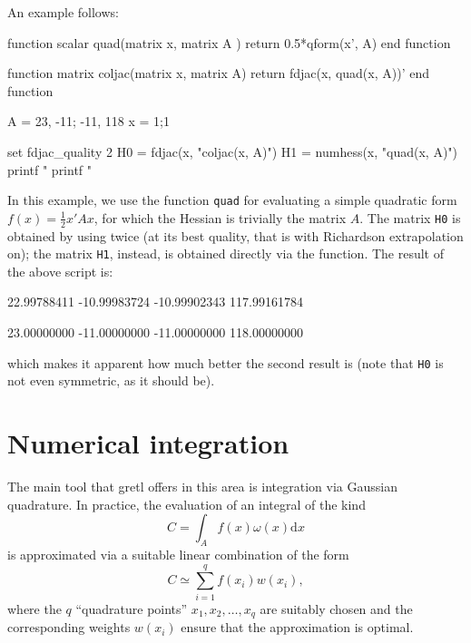 An example follows:
\begin{code}
function scalar quad(matrix x, matrix A )
    return 0.5*qform(x', A)
end function

function matrix coljac(matrix x, matrix A)
    return fdjac(x, quad(x, A))'
end function

A = {23, -11; -11, 118}
x = {1;1}

set fdjac_quality 2
H0 = fdjac(x, "coljac(x, A)")
H1 = numhess(x, "quad(x, A)")
printf "\n%
printf "\n%
\end{code}
In this example, we use the function \texttt{quad} for evaluating a
simple quadratic form $f(x) = \frac{1}{2} x'Ax$, for which the Hessian
is trivially the matrix $A$. The matrix \texttt{H0} is obtained by
using  twice (at its best quality, that is with Richardson
extrapolation on); the matrix \texttt{H1}, instead, is obtained
directly via the  function. The result of the above
script is:
\begin{code}
   22.99788411  -10.99983724
  -10.99902343  117.99161784

   23.00000000  -11.00000000
  -11.00000000  118.00000000
\end{code}
which makes it apparent how much better the second result is (note
that \texttt{H0} is not even symmetric, as it should be). 

\section{Numerical integration}
\label{sec:numint}

The main tool that gretl offers in this area is integration via
Gaussian quadrature. In practice, the evaluation of an integral of the
kind
\begin{equation}
  \label{eq:quadint}
  C = \int_{A} f(x) \omega(x) \mathrm{d}x
\end{equation}
is approximated via a suitable linear combination of the form
\begin{equation}
  \label{eq:quadsum}
  C \simeq \sum_{i=1}^q f(x_i) w(x_i) ,
\end{equation}
where the $q$ ``quadrature points'' $x_1, x_2, \ldots, x_q$ are
suitably chosen and the corresponding weights $w(x_i)$ ensure that the
approximation is optimal.

